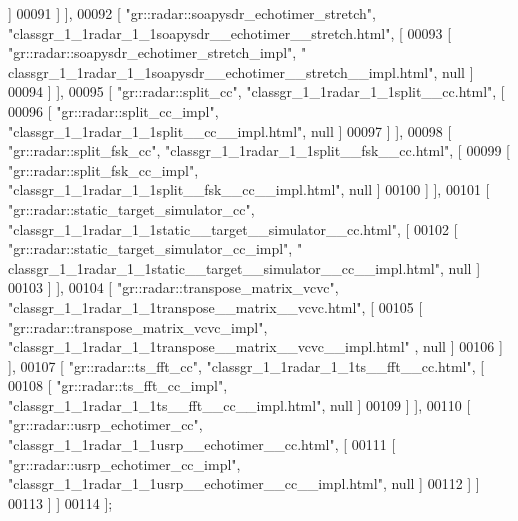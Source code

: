 \begin{DoxyCode}
      ]
00091       ] ],
00092       [ \textcolor{stringliteral}{"gr::radar::soapysdr\_echotimer\_stretch"}, \textcolor{stringliteral}{"classgr\_1\_1radar\_1\_1soapysdr\_\_echotimer\_\_stretch.html"}, [
00093         [ \textcolor{stringliteral}{"gr::radar::soapysdr\_echotimer\_stretch\_impl"}, \textcolor{stringliteral}{"
      classgr\_1\_1radar\_1\_1soapysdr\_\_echotimer\_\_stretch\_\_impl.html"}, null ]
00094       ] ],
00095       [ \textcolor{stringliteral}{"gr::radar::split\_cc"}, \textcolor{stringliteral}{"classgr\_1\_1radar\_1\_1split\_\_cc.html"}, [
00096         [ \textcolor{stringliteral}{"gr::radar::split\_cc\_impl"}, \textcolor{stringliteral}{"classgr\_1\_1radar\_1\_1split\_\_cc\_\_impl.html"}, null ]
00097       ] ],
00098       [ \textcolor{stringliteral}{"gr::radar::split\_fsk\_cc"}, \textcolor{stringliteral}{"classgr\_1\_1radar\_1\_1split\_\_fsk\_\_cc.html"}, [
00099         [ \textcolor{stringliteral}{"gr::radar::split\_fsk\_cc\_impl"}, \textcolor{stringliteral}{"classgr\_1\_1radar\_1\_1split\_\_fsk\_\_cc\_\_impl.html"}, null ]
00100       ] ],
00101       [ \textcolor{stringliteral}{"gr::radar::static\_target\_simulator\_cc"}, \textcolor{stringliteral}{"classgr\_1\_1radar\_1\_1static\_\_target\_\_simulator\_\_cc.html"}, 
      [
00102         [ \textcolor{stringliteral}{"gr::radar::static\_target\_simulator\_cc\_impl"}, \textcolor{stringliteral}{"
      classgr\_1\_1radar\_1\_1static\_\_target\_\_simulator\_\_cc\_\_impl.html"}, null ]
00103       ] ],
00104       [ \textcolor{stringliteral}{"gr::radar::transpose\_matrix\_vcvc"}, \textcolor{stringliteral}{"classgr\_1\_1radar\_1\_1transpose\_\_matrix\_\_vcvc.html"}, [
00105         [ \textcolor{stringliteral}{"gr::radar::transpose\_matrix\_vcvc\_impl"}, \textcolor{stringliteral}{"classgr\_1\_1radar\_1\_1transpose\_\_matrix\_\_vcvc\_\_impl.html"}
      , null ]
00106       ] ],
00107       [ \textcolor{stringliteral}{"gr::radar::ts\_fft\_cc"}, \textcolor{stringliteral}{"classgr\_1\_1radar\_1\_1ts\_\_fft\_\_cc.html"}, [
00108         [ \textcolor{stringliteral}{"gr::radar::ts\_fft\_cc\_impl"}, \textcolor{stringliteral}{"classgr\_1\_1radar\_1\_1ts\_\_fft\_\_cc\_\_impl.html"}, null ]
00109       ] ],
00110       [ \textcolor{stringliteral}{"gr::radar::usrp\_echotimer\_cc"}, \textcolor{stringliteral}{"classgr\_1\_1radar\_1\_1usrp\_\_echotimer\_\_cc.html"}, [
00111         [ \textcolor{stringliteral}{"gr::radar::usrp\_echotimer\_cc\_impl"}, \textcolor{stringliteral}{"classgr\_1\_1radar\_1\_1usrp\_\_echotimer\_\_cc\_\_impl.html"}, null ]
00112       ] ]
00113     ] ]
00114 ];
\end{DoxyCode}
